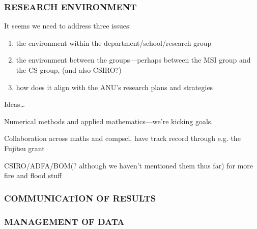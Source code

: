 \documentclass[a4paper,fontsize=12pt]{scrartcl}
\begin{document}
\subsubsection*{RESEARCH ENVIRONMENT}


It seems we need to address three issues: 

\begin{enumerate}
\item the environment within the department/school/research group
\item the environment between the groups---perhaps between the MSI
  group and the CS group, (and also CSIRO?)
\item how does it align with the ANU's research plans and strategies
\end{enumerate}

Ideas\ldots

Numerical methods and applied mathematics---we're kicking goals.

Collaboration across maths and compsci, have track record through e.g.
the Fujitsu grant

CSIRO/ADFA/BOM(? although we haven't mentioned them thus far) for more
fire and flood stuff

\subsubsection*{COMMUNICATION OF RESULTS}



\subsubsection*{MANAGEMENT OF DATA}
\end{document}
